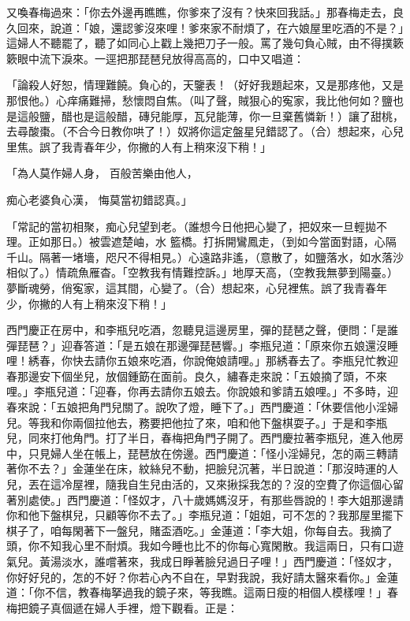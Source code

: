 又喚春梅過來：「你去外邊再瞧瞧，你爹來了沒有？快來回我話。」那春梅走去，良久回來，說道：「娘，還認爹沒來哩！爹來家不耐煩了，在六娘屋里吃酒的不是？」這婦人不聽罷了，聽了如同心上戳上幾把刀子一般。罵了幾句負心賊，由不得撲簌簌眼中流下淚來。一逕把那琵琶兒放得高高的，口中又唱道：

「論殺人好恕，情理難饒。負心的，天鑒表！（好好我題起來，又是那疼他，又是那恨他。）心痒痛難掃，愁懷悶自焦。（叫了聲，賊狠心的寃家，我比他何如？鹽也是這般鹽，醋也是這般醋，磚兒能厚，瓦兒能薄，你一旦棄舊憐新！）讓了甜桃，去尋酸棗。（不合今日教你哄了！）奴將你這定盤星兒錯認了。（合）想起來，心兒里焦。誤了我青春年少，你撇的人有上稍來沒下稍！」

「為人莫作婦人身，  百般苦樂由他人，

痴心老婆負心漢，  悔莫當初錯認真。」

「常記的當初相聚，痴心兒望到老。（誰想今日他把心變了，把奴來一旦輕拋不理。正如那日。）被雲遮楚岫，水 籃橋。打拆開鸞鳳走，（到如今當面對語，心隔千山。隔著一堵墻，咫尺不得相見。）心遠路非遙，（意散了，如鹽落水，如水落沙相似了。）情疏魚雁杳。「空教我有情難控訴。」地厚天高，（空教我無夢到陽臺。）夢斷魂勞，俏寃家，這其間，心變了。（合）想起來，心兒裡焦。誤了我青春年少，你撇的人有上稍來沒下稍！」

西門慶正在房中，和李瓶兒吃酒，忽聽見這邊房里，彈的琵琶之聲，便問：「是誰彈琵琶？」迎春答道：「是五娘在那邊彈琵琶響。」李瓶兒道：「原來你五娘還沒睡哩！綉春，你快去請你五娘來吃酒，你說俺娘請哩。」那綉春去了。李瓶兒忙教迎春那邊安下個坐兒，放個鍾筯在面前。良久，繡春走來說：「五娘摘了頭，不來哩。」李瓶兒道：「迎春，你再去請你五娘去。你說娘和爹請五娘哩。」不多時，迎春來說：「五娘把角門兒關了。說吹了燈，睡下了。」西門慶道：「休要信他小淫婦兒。等我和你兩個拉他去，務要把他拉了來，咱和他下盤棋耍子。」于是和李瓶兒，同來打他角門。打了半日，春梅把角門子開了。西門慶拉著李瓶兒，進入他房中，只見婦人坐在帳上，琵琶放在傍邊。西門慶道：「怪小淫婦兒，怎的兩三轉請著你不去？」金蓮坐在床，紋絲兒不動，把臉兒沉著，半日說道：「那沒時運的人兒，丟在這冷屋裡，隨我自生兒由活的，又來揪採我怎的？沒的空費了你這個心留著別處使。」西門慶道：「怪奴才，八十歲媽媽沒牙，有那些唇說的！李大姐那邊請你和他下盤棋兒，只顧等你不去了。」李瓶兒道：「姐姐，可不怎的？我那屋里擺下棋子了，咱每閑著下一盤兒，賭盃酒吃。」金蓮道：「李大姐，你每自去。我摘了頭，你不知我心里不耐煩。我如今睡也比不的你每心寬閑散。我這兩日，只有口遊氣兒。黃湯淡水，誰嚐著來，我成日睜著臉兒過日子哩！」西門慶道：「怪奴才，你好好兒的，怎的不好？你若心內不自在，早對我說，我好請太醫來看你。」金蓮道：「你不信，教春梅拏過我的鏡子來，等我瞧。這兩日瘦的相個人模樣哩！」春梅把鏡子真個遞在婦人手裡，燈下觀看。正是：


